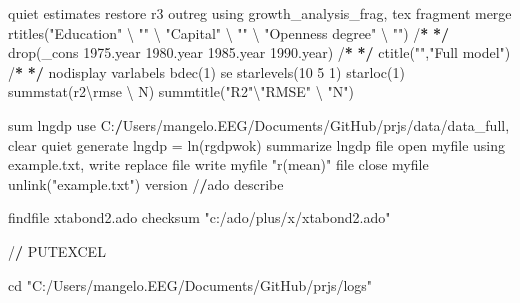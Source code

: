 \documentclass[
  12pt,
]{article}
\newenvironment{Shaded}{\begin{snugshade}}{\end{snugshade}}
\newcommand{\AttributeTok}[1]{\textcolor[rgb]{0.77,0.63,0.00}{#1}}
\newcommand{\DecValTok}[1]{\textcolor[rgb]{0.00,0.00,0.81}{#1}}
\newcommand{\ErrorTok}[1]{\textcolor[rgb]{0.64,0.00,0.00}{\textbf{#1}}}
\newcommand{\FloatTok}[1]{\textcolor[rgb]{0.00,0.00,0.81}{#1}}
\newcommand{\FunctionTok}[1]{\textcolor[rgb]{0.00,0.00,0.00}{#1}}
\newcommand{\NormalTok}[1]{#1}
\newcommand{\OtherTok}[1]{\textcolor[rgb]{0.56,0.35,0.01}{#1}}
\newcommand{\SpecialCharTok}[1]{\textcolor[rgb]{0.00,0.00,0.00}{#1}}
\newcommand{\StringTok}[1]{\textcolor[rgb]{0.31,0.60,0.02}{#1}}
\begin{document}
\begin{Shaded}
\begin{Highlighting}[]
\NormalTok{    quiet estimates restore r3}
\NormalTok{        outreg using growth\_analysis\_frag, tex fragment merge }\FunctionTok{rtitles}\NormalTok{(}\StringTok{"Education"}\NormalTok{ \textbackslash{} }\StringTok{""}\NormalTok{ \textbackslash{} }\StringTok{"Capital"}\NormalTok{ \textbackslash{} }\StringTok{""}\NormalTok{ \textbackslash{} }\StringTok{"Openness degree"}\NormalTok{ \textbackslash{} }\StringTok{""}\NormalTok{)  }\SpecialCharTok{/}\ErrorTok{*}
                \ErrorTok{*/} \FunctionTok{drop}\NormalTok{(\_cons }\FloatTok{1975.}\NormalTok{year }\FloatTok{1980.}\NormalTok{year }\FloatTok{1985.}\NormalTok{year }\FloatTok{1990.}\NormalTok{year) }\SpecialCharTok{/}\ErrorTok{*}
                \ErrorTok{*/} \FunctionTok{ctitle}\NormalTok{(}\StringTok{""}\NormalTok{,}\StringTok{"Full model"}\NormalTok{) }\SpecialCharTok{/}\ErrorTok{*}
                \ErrorTok{*/}\NormalTok{ nodisplay varlabels }\FunctionTok{bdec}\NormalTok{(}\DecValTok{1}\NormalTok{) se }\FunctionTok{starlevels}\NormalTok{(}\DecValTok{10} \DecValTok{5} \DecValTok{1}\NormalTok{) }\FunctionTok{starloc}\NormalTok{(}\DecValTok{1}\NormalTok{) }\FunctionTok{summstat}\NormalTok{(r2\textbackslash{}rmse \textbackslash{} N) }\FunctionTok{summtitle}\NormalTok{(}\StringTok{"R2"}\NormalTok{\textbackslash{}}\StringTok{"RMSE"}\NormalTok{ \textbackslash{} }\StringTok{"N"}\NormalTok{)}

\NormalTok{sum lngdp}
\NormalTok{use C}\SpecialCharTok{:}\ErrorTok{/}\NormalTok{Users}\SpecialCharTok{/}\NormalTok{mangelo.EEG}\SpecialCharTok{/}\NormalTok{Documents}\SpecialCharTok{/}\NormalTok{GitHub}\SpecialCharTok{/}\NormalTok{prjs}\SpecialCharTok{/}\NormalTok{data}\SpecialCharTok{/}\NormalTok{data\_full, clear}
\NormalTok{        quiet generate lngdp }\OtherTok{=} \FunctionTok{ln}\NormalTok{(rgdpwok)}
\NormalTok{      summarize lngdp}
\NormalTok{file open myfile using example.txt, write replace}
\NormalTok{file write myfile }\StringTok{\textasciigrave{}}\AttributeTok{"}\StringTok{\textasciigrave{}}\FunctionTok{r}\NormalTok{(mean)}\StringTok{\textquotesingle{}"\textquotesingle{}}
\NormalTok{file close myfile}
\FunctionTok{unlink}\NormalTok{(}\StringTok{"example.txt"}\NormalTok{)}
\NormalTok{version}
\SpecialCharTok{/}\ErrorTok{/}\NormalTok{ado describe}

\NormalTok{findfile xtabond2.ado}
\NormalTok{checksum }\StringTok{"c:/ado/plus/x/xtabond2.ado"}

\SpecialCharTok{/}\ErrorTok{/}\NormalTok{ PUTEXCEL}

\NormalTok{cd }\StringTok{"C:/Users/mangelo.EEG/Documents/GitHub/prjs/logs"}


\end{Highlighting}
\end{Shaded}
\end{document}
